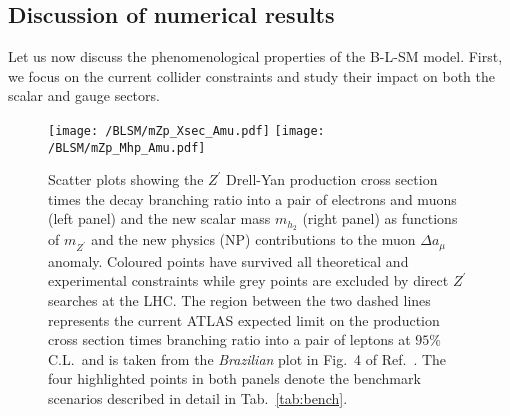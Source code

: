 \subsection{Discussion of numerical results}
\label{sec:discuss}


Let us now discuss the phenomenological properties of the B-L-SM model. First, we focus on the current collider constraints and study their impact on both the scalar and gauge sectors.
\begin{figure}[h]
	\centering
	\texttt{[image: /BLSM/mZp\_Xsec\_Amu.pdf]}
	\texttt{[image: /BLSM/mZp\_Mhp\_Amu.pdf]}
	\caption{Scatter plots showing the $Z^\prime$ Drell-Yan production cross section times the decay branching ratio into a pair of electrons and muons (left panel) and the new scalar mass $m_{h_2}$ (right panel) as functions of $m_{Z^\prime}$ and the new physics (NP) contributions to the muon $\Delta a_\mu$ anomaly. Coloured points have survived all theoretical and experimental constraints while grey points are excluded by direct $Z^\prime$ searches at the LHC. The region between the two dashed lines represents the current ATLAS expected limit on the production cross section times branching ratio into a pair of leptons at $95\%$ C.L.~and is taken from the \textit{Brazilian} plot in Fig.~4 of Ref.~\cite{Aaboud:2017buh}. The four highlighted points in both panels denote the benchmark scenarios described in detail in Tab.~\ref{tab:bench}.}
	\label{fig:Plots1}
\end{figure}	

